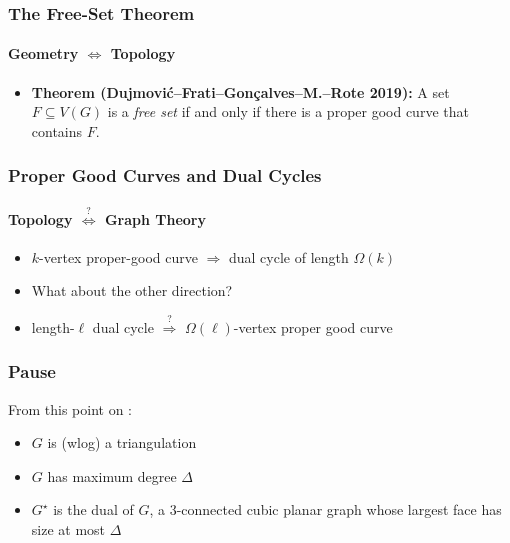 \documentclass[xcolor=dvipsnames]{beamer}
\newcommand{\dual}[1]{#1^\star}
\begin{document}
\begin{frame}
   \frametitle{The Free-Set Theorem}
   \framesubtitle{Geometry $\Leftrightarrow$ Topology}
   
   \begin{itemize}
       \item[]\textbf{Theorem (Dujmovi\'c--Frati--Gon\c{c}alves--M.--Rote 2019):} A set $F\subseteq V(G)$ is a \emph{free set} if and only if there is a proper good curve that contains $F$.
   \end{itemize}
\end{frame}

\begin{frame}
  \frametitle{Proper Good Curves and Dual Cycles} 
  \framesubtitle{Topology $\stackrel{?}{\Leftrightarrow}$ Graph Theory}
  \begin{itemize}
     \item $k$-vertex proper-good curve $\Rightarrow$ dual
       cycle of length $\Omega(k)$
       \begin{center}
       \end{center}
     \item<5-> What about the other direction?
     \item<6-> length-$\ell$ dual cycle $\stackrel{?}{\Rightarrow}$ $\Omega(\ell)$-vertex proper good curve
  \end{itemize}
\end{frame}

\begin{frame}
   \frametitle{Pause}
   From this point on :
   \begin{itemize}
      \item $G$ is (wlog) a triangulation
      \item $G$ has maximum degree $\Delta$
      \item $\dual{G}$ is the dual of $G$, a 3-connected cubic planar
      graph whose largest face has size at most $\Delta$
   \end{itemize}
\end{frame}
\end{document}

